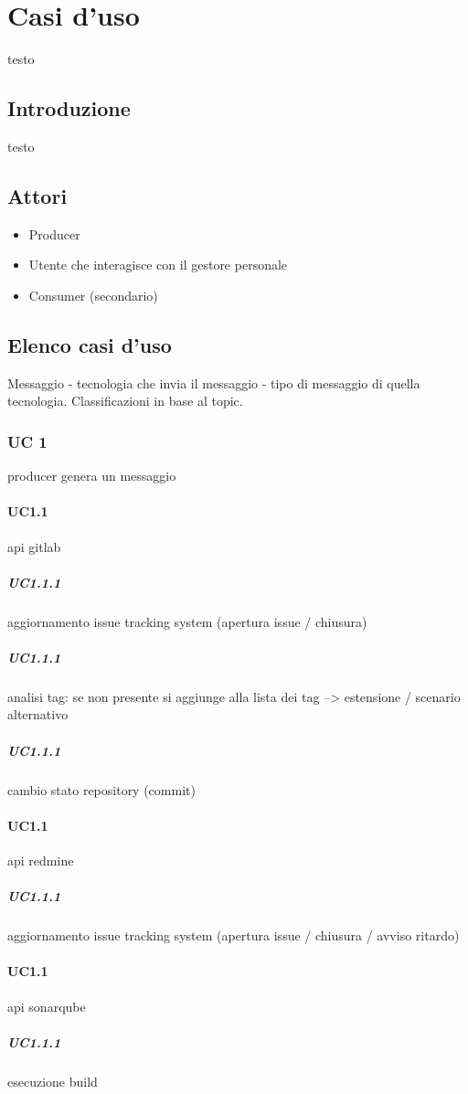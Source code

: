 \section{Casi d'uso}
testo

	\subsection{Introduzione}
	testo
	
	\subsection{Attori}
	\begin{itemize}
		\item Producer
		\item Utente che interagisce con il gestore personale
		\item Consumer (secondario)
	\end{itemize}
	
	\subsection{Elenco casi d'uso}
	Messaggio - tecnologia che invia il messaggio - tipo di messaggio di quella tecnologia.
	Classificazioni in base al topic.

\subsubsection{UC 1}
producer genera un messaggio
	\paragraph{UC1.1}
	api gitlab
		\subparagraph{UC1.1.1}
		aggiornamento issue tracking system (apertura issue / chiusura)
		\subparagraph{UC1.1.1}
		analisi tag:
			se non presente {si aggiunge alla lista dei tag} --> estensione / scenario alternativo
		\subparagraph{UC1.1.1}
		cambio stato repository (commit)

	\paragraph{UC1.1}
	api redmine
		\subparagraph{UC1.1.1}
		aggiornamento issue tracking system (apertura issue / chiusura / avviso ritardo)

	\paragraph{UC1.1}
	api sonarqube
		\subparagraph{UC1.1.1}
		esecuzione build

